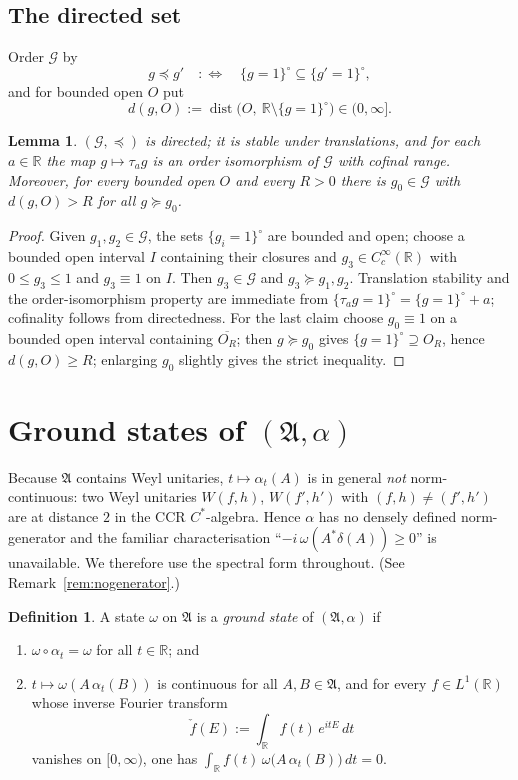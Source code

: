 \documentclass[11pt,a4paper]{article}
\theoremstyle{plain}
\newtheorem{lemma}[theorem]{Lemma}
\theoremstyle{definition}
\newtheorem{definition}[theorem]{Definition}
\newcommand{\A}{\mathfrak{A}}
\newcommand{\G}{\mathcal{G}}
\newcommand{\R}{\mathbb{R}}
\DeclareMathOperator{\dist}{dist}
\begin{document}
\subsection{The directed set}

Order $\G$ by
\[
  g\preccurlyeq g' \quad:\Longleftrightarrow\quad \{g=1\}^\circ\subseteq\{g'=1\}^\circ ,
\]
and for bounded open $O$ put
\[
  d(g,O):=\dist\bigl(O,\ \R\setminus\{g=1\}^\circ\bigr)\in(0,\infty].
\]

\begin{lemma}\label{lem:directed}
$(\G,\preccurlyeq)$ is directed; it is stable under translations, and for each $a\in\R$ the map
$g\mapsto\tau_ag$ is an order isomorphism of $\G$ with cofinal range. Moreover, for every bounded
open $O$ and every $R>0$ there is $g_0\in\G$ with $d(g,O)>R$ for all $g\succcurlyeq g_0$.
\end{lemma}

\begin{proof}
Given $g_1,g_2\in\G$, the sets $\{g_i=1\}^\circ$ are bounded and open; choose a bounded open
interval $I$ containing their closures and $g_3\in C_c^\infty(\R)$ with $0\le g_3\le1$ and
$g_3\equiv1$ on $I$. Then $g_3\in\G$ and $g_3\succcurlyeq g_1,g_2$. Translation stability and the
order-isomorphism property are immediate from $\{\tau_ag=1\}^\circ=\{g=1\}^\circ+a$; cofinality
follows from directedness. For the last claim choose $g_0\equiv1$ on a bounded open interval
containing $\overline{O_R}$; then $g\succcurlyeq g_0$ gives
$\{g=1\}^\circ\supseteq O_R$, hence $d(g,O)\ge R$; enlarging $g_0$ slightly gives the strict
inequality.
\end{proof}

\section{Ground states of $(\A,\alpha)$}

Because $\A$ contains Weyl unitaries, $t\mapsto\alpha_t(A)$ is in general \emph{not}
norm-continuous: two Weyl unitaries $W(f,h)$, $W(f',h')$ with $(f,h)\neq(f',h')$ are at distance
$2$ in the CCR $C^*$-algebra. Hence $\alpha$ has no densely defined norm-generator and the
familiar characterisation ``$-i\,\omega(A^*\delta(A))\ge0$'' is unavailable. We therefore use the
spectral form throughout. (See Remark~\ref{rem:nogenerator}.)

\begin{definition}\label{def:gs}
A state $\omega$ on $\A$ is a \emph{ground state} of $(\A,\alpha)$ if
\begin{enumerate}
\item[\rm(a)] $\omega\circ\alpha_t=\omega$ for all $t\in\R$; and
\item[\rm(b)] $t\mapsto\omega(A\,\alpha_t(B))$ is continuous for all $A,B\in\A$, and for every
      $f\in L^1(\R)$ whose inverse Fourier transform
      \[
        \check f(E):=\int_\R f(t)\,e^{itE}\,dt
      \]
      vanishes on $[0,\infty)$, one has $\displaystyle\int_\R f(t)\,\omega\bigl(A\,\alpha_t(B)\bigr)\,dt=0$.
\end{enumerate}
\end{definition}
\end{document}
